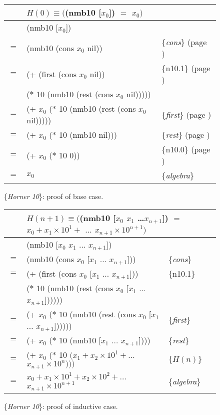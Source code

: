 \begin{figure}
\begin{center}
\begin{tabular}{rll}
&$H(0) \equiv ($\textsf{(nmb10 [$x_0$])} $=$ $x_0)$&\\
\hline
    & \textsf{(nmb10 [$x_0$])}           & \\
$=$ & \textsf{(nmb10 (cons $x_0$ nil))}  & \{\emph{cons}\} (page \pageref{first-rest-cons}) \\
$=$ & \textsf{(+ (first (cons $x_0$ nil))}  & \{n10.1\} (page \pageref{nmb10-defun}) \\
    & \phantom{\textsf{(+ }}\textsf{($*$ 10 (nmb10 (rest (cons $x_0$ nil)))))} &\\
$=$ & \textsf{(+ $x_0$ ($*$ 10 (nmb10 (rest (cons $x_0$ nil)))))}  & \{\emph{first}\} (page \pageref{first-rest-cons}) \\
$=$ & \textsf{(+ $x_0$ ($*$ 10 (nmb10 nil)))}  & \{\emph{rest}\} (page \pageref{first-rest-cons}) \\
$=$ & \textsf{(+ $x_0$ ($*$ 10 0))}  & \{n10.0\} (page \pageref{nmb10-defun}) \\
$=$ & $x_0$  & \{\emph{algebra}\} \\
\end{tabular}
\end{center}
\caption{\{\emph{Horner 10}\}: proof of base case.}
\label{fig:horner10-base}
\end{figure}

\begin{figure}
\begin{center}
\begin{tabular}{rlll}
&\multicolumn{3}{l}{$H(n+1) \equiv ($\textsf{(nmb10 [$x_0$ $x_1$ \dots $x_{n+1}$])} $=$
$x_0 + x_1 \times 10^1 +$  $\dots$ $x_{n+1} \times 10^{n+1})$}\\
\hline
    & \textsf{(nmb10 [$x_0$ $x_1$ $\dots$ $x_{n+1}$])}           & &\\
$=$ & \textsf{(nmb10 (cons $x_0$ [$x_1$ $\dots$ $x_{n+1}$]))}    & \{\emph{cons}\}&\\
$=$ & \textsf{(+ (first (cons $x_0$ [$x_1$ $\dots$ $x_{n+1}$]))}  & \{n10.1\} &\\
    & \phantom{\textsf{(+ }}\textsf{($*$ 10 (nmb10 (rest (cons $x_0$ [$x_1$ $\dots$ $x_{n+1}$])))))} &&\\
$=$ & \textsf{(+ $x_0$ ($*$ 10 (nmb10 (rest (cons $x_0$ [$x_1$ $\dots$ $x_{n+1}$])))))}      & \{\emph{first}\} &\\
$=$ & \textsf{(+ $x_0$ ($*$ 10 (nmb10 [$x_1$ $\dots$ $x_{n+1}$])))}                          & \{\emph{rest}\}&\\
$=$ & \textsf{(+ $x_0$ ($*$ 10 $(x_1 + x_2 \times 10^1 + \dots$ $x_{n+1} \times 10^{n})))$}  & \{$H(n)$\}&\\
$=$ & $x_0 + x_1 \times 10^1 + x_2 \times 10^2 + \dots$ $x_{n+1} \times 10^{n+1}$   & \{\emph{algebra}\} &\\
\end{tabular}
\end{center}
\caption{\{\emph{Horner 10}\}: proof of inductive case.}
\label{fig:horner10-induc}
\end{figure}

